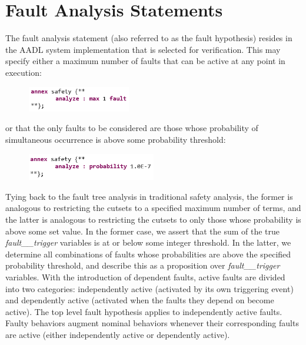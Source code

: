 \section{Fault Analysis Statements}
The fault analysis statement (also referred to as the fault hypothesis) resides in the AADL system implementation that is selected for verification. This may specify either a maximum number of faults that can be active at any point in execution:

\begin{figure}[h!]
	\vspace{-0.1in}
		\includegraphics[width=0.4\textwidth]{images/hypothesisMaxN.png}
	\vspace{-0.1in}
	\label{fig:hypothesisMaxN}
\end{figure}
or that the only faults to be considered are those whose probability of simultaneous occurrence is above some probability threshold: 

\begin{figure}[h!]
	\vspace{-0.1in}
		\includegraphics[width=0.5\textwidth]{images/hypothesisProb.png}
	\vspace{-0.1in}
\end{figure}

Tying back to the fault tree analysis in traditional safety analysis, the former is analogous to restricting the cutsets to a specified maximum number of terms, and the latter is analogous to restricting the cutsets to only those whose probability is above some set value. In the former case, we assert that the sum of the true {\em fault\_\_trigger} variables is at or below some integer threshold.  In the latter, we determine all combinations of faults whose probabilities are above the specified probability threshold, and describe this as a proposition over {\em fault\_\_trigger} variables. 
%
With the introduction of dependent faults, active faults are divided into two categories: independently active (activated by its own triggering event) and dependently active (activated when the faults they depend on become active). The top level fault hypothesis applies to independently active faults. Faulty behaviors augment nominal behaviors whenever their corresponding faults are active (either independently active or dependently active).









